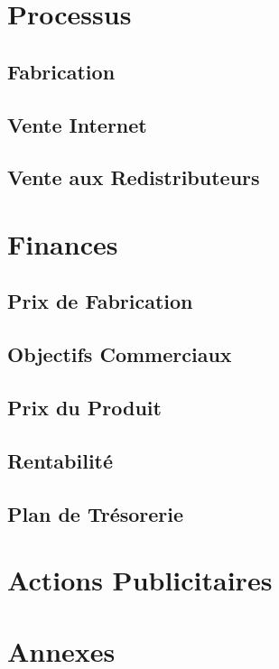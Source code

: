 \documentclass[10pt,a4paper]{article}
\begin{document}
\section{Processus}

\subsection{Fabrication}

\subsection{Vente Internet}

\subsection{Vente aux Redistributeurs}

\section{Finances}

\subsection{Prix de Fabrication}

\subsection{Objectifs Commerciaux}

\subsection{Prix du Produit}

\subsection{Rentabilité}

\subsection{Plan de Trésorerie}

\section{Actions Publicitaires}

\section{Annexes}
\end{document}
